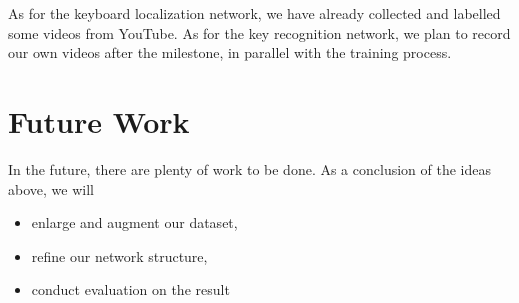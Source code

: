 \documentclass[10pt,twocolumn,letterpaper]{article}
\begin{document}
As for the keyboard localization network, we have already collected and labelled some videos from YouTube. As for the key recognition network, we plan to record our own videos after the milestone, in parallel with the training process.

\section{Future Work}
  In the future, there are plenty of work to be done. As a conclusion of the ideas above, we will 
  \begin{itemize}
    \item enlarge and augment our dataset,
    \item refine our network structure,
    \item conduct evaluation on the result
  \end{itemize}

{\small


}
\end{document}
